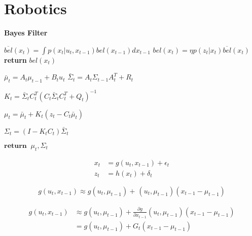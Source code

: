\chapter{Robotics}


\begin{algorithm}
    \renewcommand{\thealgorithm}{} %
    \caption{\textbf{Bayes Filter}}\label{alg:cap}

    \begin{algorithmic}[1]
        \State $\overline{bel}(x_t) = \int{p(x_t|u_t, x_{t-1})bel(x_{t-1})dx_{t-1}}$
        \State $bel(x_t) = \eta{}p(z_t|x_t)\overline{bel}(x_t)$
        \EndFor
        \State \textbf{return} $bel(x_t)$
        \EndFunction

    \end{algorithmic}

\end{algorithm}

\newpage
\begin{algorithm}
    \renewcommand{\thealgorithm}{}
    \begin{algorithmic}[1]
    \State $\bar{\mu}_t = A_t \mu_{t-1} + B_t u_t$
    \State $\bar{\Sigma}_t = A_t\Sigma_{t-1}A_t^T + R_t$

    \State $K_t = \bar{\Sigma}_t C_t^T (C_t \bar{\Sigma}_t  C_t^T + Q_t)^{-1}$  

    \State $\mu_t = \bar{\mu}_t + K_t(z_t - C_t \bar{\mu}_t)$

    \State $\Sigma_t = (I - K_tC_t) \bar{\Sigma}_t$

    \State $\textbf{return} \;\; \mu_t, \Sigma_t$
    \EndFunction

\end{algorithmic}
\end{algorithm}



\begin{align*}
x_t & = g(u_t, x_{t-1}) + \epsilon_t \\
z_t & = h(x_t) + \delta_t
\end{align*}

\[
g(u_t, x_{t-1}) \approx g(u_t, \mu_{t-1}) + \frac{}{}(u_t, \mu_{t-1})(x_{t-1} - \mu_{t-1})
\]

\begin{equation}
    \begin{split}
    g(u_t, x_{t-1}) & \approx g(u_t, \mu_{t-1}) + \frac{\partial g}{\partial x_{t-1}}(u_t, \mu_{t-1})(x_{t-1} - \mu_{t-1}) \\
                    & = g(u_t, \mu_{t-1}) + G_t(x_{t-1} - \mu_{t-1})
    \end{split}
\end{equation}



